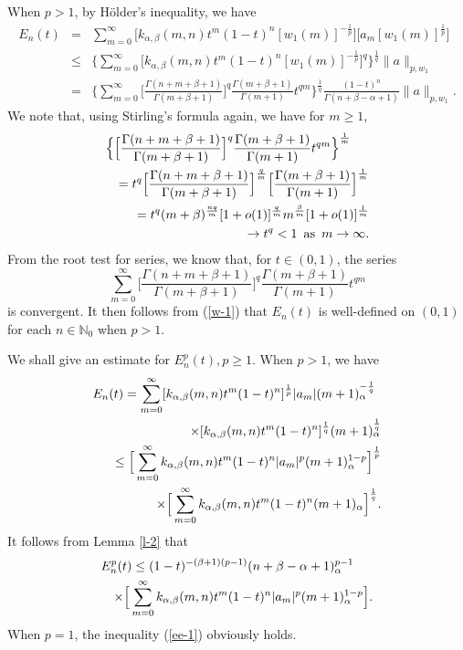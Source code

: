 \documentclass[10pt]{amsart}
\theoremstyle{definition}
\theoremstyle{question}
\numberwithin{equation}{section}
\begin{document}
When $p>1$, by H\"older's inequality, we have 
\begin{eqnarray}\label{w-1}
E_n(t)&=& \sum_{m=0}^{\infty}\Big[k_{\alpha, \beta}(m,n)t^m (1-t)^n[w_{1}(m)]^{-\frac{1}{p}}\Big]\Big[a_m [w_{1}(m)]^{\frac{1}{p}}\Big]  \nonumber \\
&\leq & \Big\{\sum_{m=0}^{\infty}\Big[k_{\alpha, \beta}(m,n)t^m (1-t)^n[w_{1}(m)]^{-\frac{1}{p}}\Big]^{q}\Big\}^{\frac{1}{q}}\|a\|_{p,w_1}\nonumber \\
&=& \Big\{\sum_{m=0}^{\infty} \Big[\frac{\Gamma(n+m+\beta+1)}{\Gamma(m+\beta+1)}\Big]^q \frac{\Gamma(m+\beta+1)}{\Gamma(m+1)} t^{qm}\Big\}^{\frac{1}{q}}\frac{(1-t)^{n}}{\Gamma(n+\beta-\alpha+1)}\|a\|_{p,w_1}.
\end{eqnarray}
We note that, using Stirling's formula again, we have for $m\geq 1$,
\begin{eqnarray}\lefteqn{\Big\{\Big[\frac{\Gamma(n+m+\beta+1)}{\Gamma(m+\beta+1)}\Big]^q \frac{\Gamma(m+\beta+1)}{\Gamma(m+1)} t^{qm}\Big\}^{\frac{1}{m}}}\nonumber \\
&&=t^q\Big[\frac{\Gamma(n+m+\beta+1)}{\Gamma(m+\beta+1)}\Big]^{\frac{q}{m}}\Big[\frac{\Gamma(m+\beta+1)}{\Gamma(m+1)}\Big]^{\frac{1}{m}}\nonumber \\
&&= t^q (m+\beta)^{\frac{nq}{m}}[1+o(1)]^{\frac{q}{m}}m^{\frac{\beta}{m}}[1+o(1)]^{\frac{1}{m}}\nonumber \\
&&\rightarrow t^q<1\,\,\, {\text{as}}\,\,\, m\rightarrow \infty.\nonumber
\end{eqnarray}
From the root test for series, we know that, for $t\in(0,1)$, the series 
\begin{equation} \sum_{m=0}^{\infty} \Big[\frac{\Gamma(n+m+\beta+1)}{\Gamma(m+\beta+1)}\Big]^q \frac{\Gamma(m+\beta+1)}{\Gamma(m+1)} t^{qm} \nonumber 
\end{equation}
is convergent. It then follows from (\ref{w-1}) that $E_{n}(t)$ is well-defined on $(0,1)$ for each $n\in \mathbb{N}_0$ when $p>1$.

We shall give an estimate for $E_n^p(t), p\geq 1$. When $p>1$, we have
\begin{eqnarray}
\lefteqn{E_n(t)=\sum_{m=0}^{\infty}[k_{\alpha, \beta}(m,n)t^m (1-t)^n]^{\frac{1}{p}}|a_m|(m+1)_{\alpha}^{-\frac{1}{q}}} \nonumber \\
&& \qquad\quad\quad \times [k_{\alpha, \beta}(m,n)t^m (1-t)^n]^{\frac{1}{q}}(m+1)_{\alpha}^{\frac{1}{q}} \nonumber \\
&& \leq \Big[\sum_{m=0}^{\infty}k_{\alpha, \beta}(m,n)t^m (1-t)^n|a_m|^p (m+1)_{\alpha}^{1-p} \Big]^{\frac{1}{p}}\nonumber \\
&& \qquad\quad\quad \times \Big[\sum_{m=0}^{\infty}k_{\alpha, \beta}(m,n)t^m (1-t)^n(m+1)_{\alpha}\Big]^{\frac{1}{q}}.\nonumber 
\end{eqnarray}
It follows from Lemma \ref{l-2} that 
\begin{eqnarray}\label{ee-1}
\lefteqn{E_n^p(t)\leq (1-t)^{-(\beta+1)(p-1)}(n+\beta-\alpha+1)_{\alpha}^{p-1}}\nonumber \\
&&\times\Big[\sum_{m=0}^{\infty}k_{\alpha, \beta}(m,n)t^m (1-t)^n|a_m|^p(m+1)_{\alpha}^{1-p}\Big]. 
\end{eqnarray}
When $p=1$, the inequality (\ref{ee-1}) obviously holds. 
\end{document}
